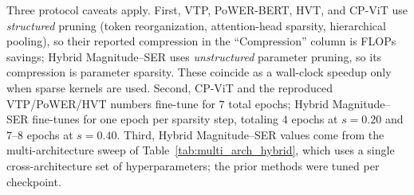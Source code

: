 \documentclass[11pt]{article}
\theoremstyle{plain}
\theoremstyle{definition}
\theoremstyle{remark}
\newcommand{\1}{\mathbf{1}}
\begin{document}
Three protocol caveats apply.  First, VTP, PoWER-BERT, HVT, and CP-ViT use \emph{structured} pruning (token reorganization, attention-head sparsity, hierarchical pooling), so their reported compression in the ``Compression'' column is FLOPs savings; Hybrid Magnitude--SER uses \emph{unstructured} parameter pruning, so its compression is parameter sparsity.  These coincide as a wall-clock speedup only when sparse kernels are used.  Second, CP-ViT and the reproduced VTP/PoWER/HVT numbers fine-tune for \(7\) total epochs; Hybrid Magnitude--SER fine-tunes for one epoch per sparsity step, totaling \(4\) epochs at \(s=0.20\) and \(7\)--\(8\) epochs at \(s=0.40\).  Third, Hybrid Magnitude--SER values come from the multi-architecture sweep of Table~\ref{tab:multi_arch_hybrid}, which uses a single cross-architecture set of hyperparameters; the prior methods were tuned per checkpoint.
\end{document}
